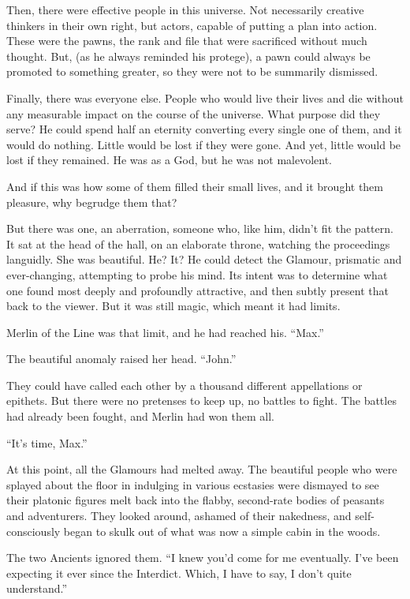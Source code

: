 Then, there were effective people in this universe. Not necessarily creative thinkers in their own right, but actors, capable of putting a plan into action. These were the pawns, the rank and file that were sacrificed without much thought. But, (as he always reminded his protege), a pawn could always be promoted to something greater, so they were not to be summarily dismissed.

Finally, there was everyone else. People who would live their lives and die without any measurable impact on the course of the universe. What purpose did they serve? He could spend half an eternity converting every single one of them, and it would do nothing. Little would be lost if they were gone. And yet, little would be lost if they remained. He was as a God, but he was not malevolent.

And if this was how some of them filled their small lives, and it brought them pleasure, why begrudge them that?

But there was one, an aberration, someone who, like him, didn’t fit the pattern. It sat at the head of the hall, on an elaborate throne, watching the proceedings languidly. She was beautiful. He? It? He could detect the Glamour, prismatic and ever-changing, attempting to probe his mind. Its intent was to determine what one found most deeply and profoundly attractive, and then subtly present that back to the viewer. But it was still magic, which meant it had limits.

Merlin of the Line was that limit, and he had reached his. “Max.”

The beautiful anomaly raised her head. “John.”

They could have called each other by a thousand different appellations or epithets. But there were no pretenses to keep up, no battles to fight. The battles had already been fought, and Merlin had won them all.

“It’s time, Max.”

At this point, all the Glamours had melted away. The beautiful people who were splayed about the floor in indulging in various ecstasies were dismayed to see their platonic figures melt back into the flabby, second-rate bodies of peasants and adventurers. They looked around, ashamed of their nakedness, and self-consciously began to skulk out of what was now a simple cabin in the woods.

The two Ancients ignored them. “I knew you’d come for me eventually. I’ve been expecting it ever since the Interdict. Which, I have to say, I don’t quite understand.”

